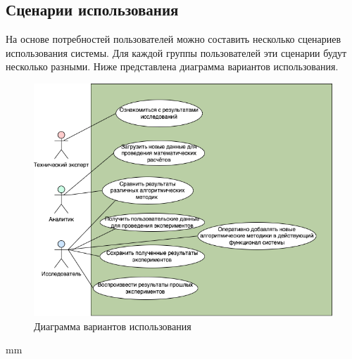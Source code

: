 \subsection*{\large{Сценарии использования}}

На основе потребностей пользователей можно составить несколько сценариев использования системы.
Для каждой группы пользователей эти сценарии будут несколько разными.
Ниже представлена диаграмма вариантов использования.


\begin{figure}[H]
	\hspace*{-2.5 cm}\includegraphics[width=\textwidth, left]{analysis/pictures/usecases/use-case}
	\caption{Диаграмма вариантов использования}
	\label{pic:architecture__use-case-diagram}
\end{figure}
 mm
